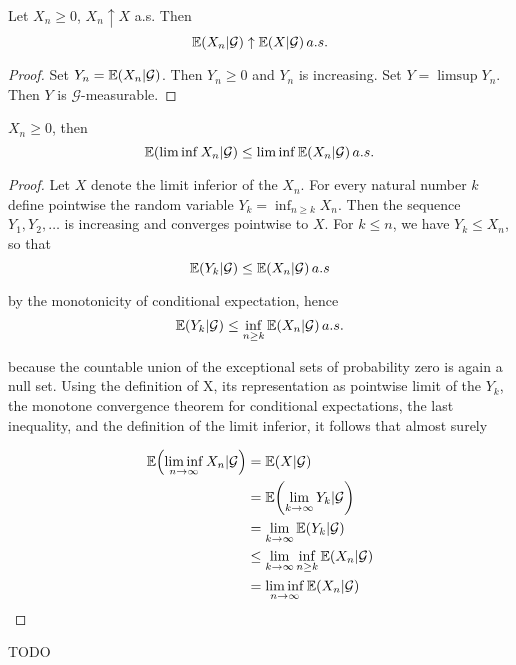 \begin{thm}  Let $X_{n} \geq 0$,
  $X_{n} \uparrow X$ a.s.  Then
  \begin{equation}
    \label{exmp:general:7}
    \E{X_{n} | \mathcal{G}} \uparrow \E{X | \mathcal{G}} a.s.
  \end{equation} 
\end{thm}

\begin{proof}
  Set $Y_{n} = \E{X_{n} | \mathcal{G}}$.  Then $Y_{n} \geq 0$ and
    $Y_{n}$ is increasing.  Set $Y  = \limsup Y_{n}$.  Then $Y$ is
    $\mathcal{G}$-measurable.  
\end{proof}

\begin{thm}  $X_{n} \geq 0$, then
  \begin{equation}
    \label{exmp:general:8}
    \E{\liminf X_{n} | \mathcal{G}} \leq \liminf \E{X_{n} |
      \mathcal{G}} a.s.
  \end{equation}
\end{thm}

\begin{proof}
  Let $X$ denote the limit inferior of the $X_{n}$. For every natural number
  $k$ define pointwise the random variable $Y_k= \inf_{n \geq k} X_n$.
  Then the sequence $Y_{1}, Y_{2}, \dots$ is increasing and converges pointwise
  to $X$. For $k \leq n$, we have $Y_{k} \leq X_{n}$, so that 
  \begin{equation}
    \label{eq:6}
    \E{Y_k | \mathcal{G}} \leq \E{X_n | \mathcal{G}} a.s
  \end{equation}

  by the monotonicity of conditional expectation, hence
  \begin{equation}
    \label{eq:7}
    \E{Y_k|\mathcal{G}} \leq \inf_{n \geq k} \E{X_n | \mathcal{G}} a.s.
  \end{equation}

  because the countable union of the exceptional sets of probability
  zero is again a null set. Using the definition of X, its
  representation as pointwise limit of the $Y_k$, the monotone convergence
  theorem for conditional expectations, the last inequality, and the
  definition of the limit inferior, it follows that almost surely

  \begin{align}
  \E{\liminf_{n \rightarrow \infty} X_{n} | \mathcal{G}} 
 & = \E{X |
    \mathcal{G}}                                         \\
 & = \E{\lim_{k \rightarrow \infty} Y_{k} | \mathcal{G}} \\
 & = \lim_{k \rightarrow \infty} \E{Y_{k} | \mathcal{G}} \\
 & \leq \lim_{k \rightarrow \infty} \inf_{n \geq k} \E{X_{n} |
    \mathcal{G}}                                         \\
 & = \liminf_{n \rightarrow \infty} \E{X_{n} | \mathcal{G}}
 \end{align}
\end{proof}


\begin{thm} TODO
  
\end{thm}


